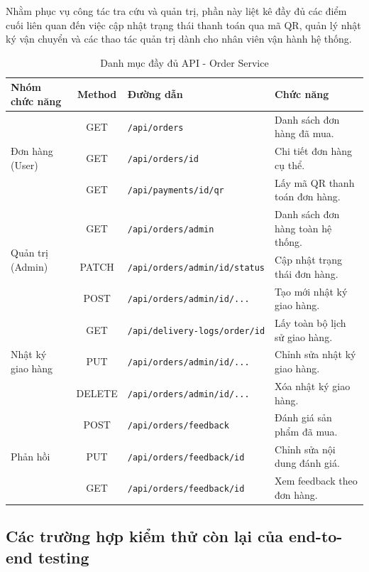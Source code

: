 Nhằm phục vụ công tác tra cứu và quản trị, phần này liệt kê đầy đủ các điểm cuối liên quan đến việc cập nhật trạng thái thanh toán qua mã QR, quản lý nhật ký vận chuyển và các thao tác quản trị dành cho nhân viên vận hành hệ thống.

\begin{table}[H]
\centering
\caption{Danh mục đầy đủ API - Order Service}
\label{tab:full_order_api_appendix}
\begin{tabular}{|l|c|l|l|}
\hline
\textbf{Nhóm chức năng} & \textbf{Method} & \textbf{Đường dẫn} & \textbf{Chức năng} \\ \hline
\multirow{3}{*}{Đơn hàng (User)} & GET & \texttt{/api/orders} & Danh sách đơn hàng đã mua. \\ \cline{2-4}
& GET & \texttt{/api/orders/{id}} & Chi tiết đơn hàng cụ thể. \\ \cline{2-4}
& GET & \texttt{/api/payments/{id}/qr} & Lấy mã QR thanh toán đơn hàng. \\ \hline
\multirow{3}{*}{Quản trị (Admin)} & GET & \texttt{/api/orders/admin} & Danh sách đơn hàng toàn hệ thống. \\ \cline{2-4}
& PATCH & \texttt{/api/orders/admin/{id}/status} & Cập nhật trạng thái đơn hàng. \\ \cline{2-4}
& POST & \texttt{/api/orders/admin/{id}/...} & Tạo mới nhật ký giao hàng. \\ \hline
\multirow{3}{*}{Nhật ký giao hàng} & GET & \texttt{/api/delivery-logs/order/{id}} & Lấy toàn bộ lịch sử giao hàng. \\ \cline{2-4}
& PUT & \texttt{/api/orders/admin/{id}/...} & Chỉnh sửa nhật ký giao hàng. \\ \cline{2-4}
& DELETE & \texttt{/api/orders/admin/{id}/...} & Xóa nhật ký giao hàng. \\ \hline
\multirow{3}{*}{Phản hồi} & POST & \texttt{/api/orders/feedback} & Đánh giá sản phẩm đã mua. \\ \cline{2-4}
& PUT & \texttt{/api/orders/feedback/{id}} & Chỉnh sửa nội dung đánh giá. \\ \cline{2-4}
& GET & \texttt{/api/orders/feedback/{id}} & Xem feedback theo đơn hàng. \\ \hline
\end{tabular}
\end{table}

\subsection*{Các trường hợp kiểm thử còn lại của end-to-end testing} \label{sec:appx_e2e_testing}

